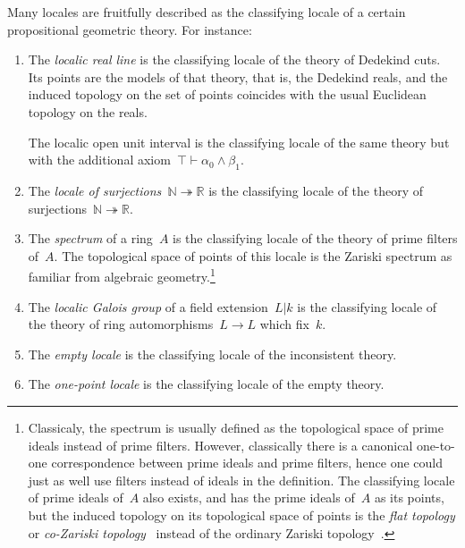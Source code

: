\documentclass{ws-rv9x6}
\newcommand{\NN}{\mathbb{N}}
\newcommand{\RR}{\mathbb{R}}
\renewcommand{\_}{\mathpunct{.}}
\newcommand{\?}{\,{:}\,}
\begin{document}
Many locales are fruitfully described as the classifying locale of a certain
propositional geometric theory. For instance:
\begin{enumerate}
\item The \emph{localic real line} is the classifying locale of the theory of
Dedekind cuts. Its points are the models of that theory, that is, the Dedekind
reals, and the induced topology on the set of points coincides with the usual
Euclidean topology on the reals.

The localic open unit interval is the classifying locale of the
same theory but with the additional axiom~$\top \vdash \alpha_0 \wedge \beta_1$.
\item The \emph{locale of surjections~$\NN \twoheadrightarrow \RR$} is the
classifying locale of the theory of surjections~$\NN \twoheadrightarrow \RR$.
\item The \emph{spectrum} of a ring~$A$ is the classifying locale of the
theory of prime filters of~$A$. The topological space of points of this locale
is the Zariski spectrum as familiar from algebraic
geometry.\footnote{Classicaly, the spectrum is usually defined as the
topological space of prime ideals instead of prime filters. However,
classically there is a canonical one-to-one correspondence between prime ideals
and prime filters, hence one could just as well use filters instead of ideals
in the definition. The classifying locale of prime ideals of~$A$ also exists,
and has the prime ideals of~$A$ as its points, but the induced topology on its
topological space of points is the \emph{flat topology} or \emph{co-Zariski
topology}~\cite{tarizadeh:flat} instead of the ordinary
Zariski topology~\cite[Proposition~4.5]{johnstone:rings-fields-and-spectra}.}
\item The \emph{localic Galois group} of a field extension~$L|k$ is the
classifying locale of the theory of ring automorphisms~$L \to L$ which fix~$k$.
\item The \emph{empty locale} is the classifying locale of the inconsistent theory.
\item The \emph{one-point locale} is the classifying locale of the empty theory.
\end{enumerate}
\end{document}
